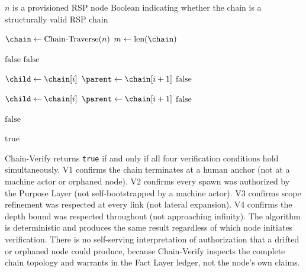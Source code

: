 \begin{algorithm}
\caption{Chain-Verify($n$) --- Verify the authorization chain from node $n$ to human anchor}
\label{alg:chain-verify}
\begin{algorithmic}[1]
\REQUIRE $n$ is a provisioned RSP node
\ENSURE $\text{Boolean}$ indicating whether the chain is a structurally valid RSP chain

\STATE $\chain \leftarrow \text{Chain-Traverse}(n)$
\STATE $m \leftarrow \text{len}(\chain)$

\STATE {}
\IF{$\alpha(\chain[m-1]) \neq \bot$}
    \STATE \RETURN $\text{false}$ 
\ENDIF
\IF{$\neg\hmannchor{\chain[m-1]}$}
    \STATE \RETURN $\text{false}$ 
\ENDIF

\STATE {}
    \STATE $\child \leftarrow \chain[i]$
    \STATE $\parent \leftarrow \chain[i+1]$
        \STATE \RETURN $\text{false}$ 
    \ENDIF
\ENDFOR

\STATE {}
    \STATE $\child \leftarrow \chain[i]$
    \STATE $\parent \leftarrow \chain[i+1]$
        \STATE \RETURN $\text{false}$ 
    \ENDIF
\ENDFOR

\STATE {}
        \STATE \RETURN $\text{false}$ 
    \ENDIF
\ENDFOR

\RETURN $\text{true}$
\end{algorithmic}
\end{algorithm}

\bigskip
\noindent Chain-Verify returns \texttt{true} if and only if all four verification conditions hold simultaneously. V1 confirms the chain terminates at a human anchor (not at a machine actor or orphaned node). V2 confirms every spawn was authorized by the Purpose Layer (not self-bootstrapped by a machine actor). V3 confirms scope refinement was respected at every link (not lateral expansion). V4 confirms the depth bound was respected throughout (not approaching infinity). The algorithm is deterministic and produces the same result regardless of which node initiates verification. There is no self-serving interpretation of authorization that a drifted or orphaned node could produce, because Chain-Verify inspects the complete chain topology and warrants in the Fact Layer ledger, not the node's own claims.

